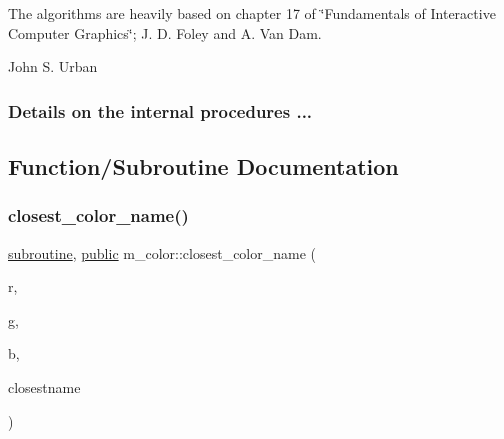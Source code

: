 \begin{DoxyDescription}
\item[R\+E\+F\+E\+R\+E\+N\+C\+ES]The algorithms are heavily based on chapter 17 of \char`\"{}\+Fundamentals of Interactive Computer Graphics\char`\"{}; J. D. Foley and A. Van Dam. 


\item[A\+U\+T\+H\+OR ]

John S. Urban




\end{DoxyDescription}\subsubsection*{Details on the internal procedures ...}

\subsection{Function/\+Subroutine Documentation}
\mbox{\label{namespacem__color_acad72628ee0b77cf87f40cd46734fb18}} 
\subsubsection{\texorpdfstring{closest\+\_\+color\+\_\+name()}{closest\_color\_name()}}
{\footnotesize\ttfamily \hyperlink{M__stopwatch_83_8txt_acfbcff50169d691ff02d4a123ed70482}{subroutine}, \hyperlink{M__stopwatch_83_8txt_a2f74811300c361e53b430611a7d1769f}{public} m\+\_\+color\+::closest\+\_\+color\+\_\+name (\begin{DoxyParamCaption}\item[{\hyperlink{read__watch_83_8txt_abdb62bde002f38ef75f810d3a905a823}{real}, intent(\hyperlink{M__journal_83_8txt_afce72651d1eed785a2132bee863b2f38}{in})}]{r,  }\item[{\hyperlink{read__watch_83_8txt_abdb62bde002f38ef75f810d3a905a823}{real}, intent(\hyperlink{M__journal_83_8txt_afce72651d1eed785a2132bee863b2f38}{in})}]{g,  }\item[{\hyperlink{read__watch_83_8txt_abdb62bde002f38ef75f810d3a905a823}{real}, intent(\hyperlink{M__journal_83_8txt_afce72651d1eed785a2132bee863b2f38}{in})}]{b,  }\item[{\hyperlink{option__stopwatch_83_8txt_abd4b21fbbd175834027b5224bfe97e66}{character}(len=$\ast$), intent(out)}]{closestname }\end{DoxyParamCaption})}


